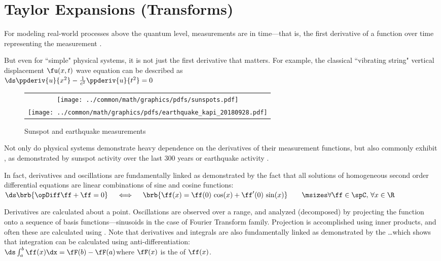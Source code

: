 \chapter{Taylor Expansions (Transforms)}
For modeling real-world processes above the quantum level, measurements are  in time---that is,
the first derivative of a function over time representing the measurement .

But even for ``simple" physical systems, it is not just the first derivative that matters.
For example, the classical ``vibrating string" vertical displacement $\fu(x,t)$ wave equation can be described as
        \\\indentx$\ds\ppderiv{u}{x^2} - \frac{1}{c^2}\ppderiv{u}{t^2} = 0$

\begin{figure}
  \centering
  \begin{tabular}{c}
    \texttt{[image: ../common/math/graphics/pdfs/sunspots.pdf]}\\
    \texttt{[image: ../common/math/graphics/pdfs/earthquake\_kapi\_20180928.pdf]}
  \end{tabular}
  \caption{Sunspot and earthquake measurements\label{fig:sunspot}}
\end{figure}
Not only do physical systems demonstrate heavy dependence on the derivatives of their measurement functions,
but also commonly exhibit , as demonstrated by sunspot activity over the last 300 years or
earthquake activity .

In fact, derivatives and oscillations are fundamentally linked
as demonstrated by the fact that 
all solutions of homogeneous second order differential equations
        are linear combinations of sine and cosine functions:
        \\\indentx$\ds  \brb{\opDiff\ff + \ff=0}
  \quad\iff\quad
  \brb{\ff(x) = \ff(0)\,\cos(x) + \ff^\prime(0)\,\sin(x)}
  \qquad\msizes\forall\ff\in\spC,\,\forall x\in\R$

Derivatives are calculated  about a point.
Oscillations are observed  over a range,
and analyzed (decomposed) by projecting the function onto a sequence of basis functions---sinusoids 
in the case of Fourier Transform family.
Projection is accomplished using inner products, and often these are calculated using .
Note that derivatives and integrals are also fundamentally linked as demonstrated by the
\ldots which shows that integration 
can be calculated using anti-differentiation:
\\\indentx$\ds\int_a^b \ff(x)\dx = \fF(b) - \fF(a)$\qquad where $\fF(x)$ is the  of $\ff(x)$.

